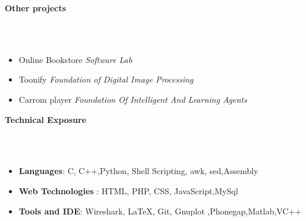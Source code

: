 \documentclass[a4paper,10pt]{article}
\newcommand{\lsep}{-0.5cm}
\newcommand{\resheading}[1]{{\small \colorbox{mygrey}{\begin{minipage}{0.975\textwidth}{\textbf{#1 \vphantom{p\^{E}}}}\end{minipage}}}}
\begin{document}
\resheading{\textbf{\large Other projects} }\\[\lsep]\\[-0.3cm]

\begin{itemize}

\item {Online Bookstore }
 \hfill\emph{Software Lab} \\[-0.6cm]
	

\item {Toonify
} 
  \hfill\emph{Foundation of Digital Image Processing } \\[-0.6cm]


\item {Carrom player
} 
  \hfill\emph{Foundation Of Intelligent And Learning Agents } \\[-0.6cm]
	

	
\end{itemize}

\resheading{\textbf{\large Technical Exposure} }\\[\lsep]\\[-0.3cm]

 \begin{itemize}
  \item \textbf{Languages}: C, C++,Python, Shell Scripting, awk, sed,Assembly \\[-0.55cm] 
  \item \textbf{Web Technologies }: HTML, PHP, CSS, JavaScript,MySql \\[-0.55cm] 
 \item \textbf{Tools and IDE}: Wireshark, \LaTeX, Git, Gnuplot ,Phonegap,Matlab,VC++\\[-0.6cm]
  \end{itemize}
\end{document}
